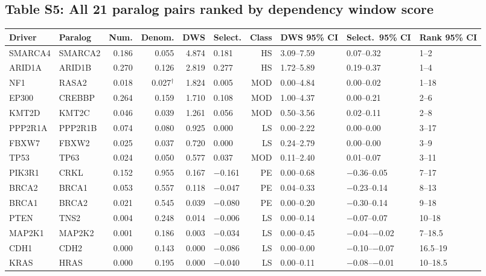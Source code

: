 \documentclass[11pt,a4paper]{article}
\begin{document}
\subsection{Table S5: All 21 paralog pairs ranked by dependency window score}
\begin{table}[H]
\centering
\scriptsize
\setlength{\tabcolsep}{3pt}
\begin{tabular}{llrrrlrlll}
\toprule
\textbf{Driver} & \textbf{Paralog} & \textbf{Num.} & \textbf{Denom.} & \textbf{DWS} & \textbf{Select.} & \textbf{Class} & \textbf{DWS 95\% CI} & \textbf{Select.\ 95\% CI} & \textbf{Rank 95\% CI} \\
\midrule
SMARCA4 & SMARCA2 & 0.186 & 0.055 & 4.874 & 0.181 & HS & 3.09--7.59 & 0.07--0.32 & 1--2 \\
ARID1A & ARID1B & 0.270 & 0.126 & 2.819 & 0.277 & HS & 1.72--5.89 & 0.19--0.37 & 1--4 \\
NF1 & RASA2 & 0.018 & 0.027$^{\dagger}$ & 1.824 & 0.005 & MOD & 0.00--4.84 & 0.00--0.02 & 1--18 \\
EP300 & CREBBP & 0.264 & 0.159 & 1.710 & 0.108 & MOD & 1.00--4.37 & 0.00--0.21 & 2--6 \\
KMT2D & KMT2C & 0.046 & 0.039 & 1.261 & 0.056 & MOD & 0.50--3.56 & 0.02--0.11 & 2--8 \\
PPP2R1A & PPP2R1B & 0.074 & 0.080 & 0.925 & 0.000 & LS & 0.00--2.22 & 0.00--0.00 & 3--17 \\
FBXW7 & FBXW2 & 0.025 & 0.037 & 0.720 & 0.000 & LS & 0.24--2.79 & 0.00--0.00 & 3--9 \\
TP53 & TP63 & 0.024 & 0.050 & 0.577 & 0.037 & MOD & 0.11--2.40 & 0.01--0.07 & 3--11 \\
PIK3R1 & CRKL & 0.152 & 0.955 & 0.167 & $-$0.161 & PE & 0.00--0.68 & $-$0.36--0.05 & 7--17 \\
BRCA2 & BRCA1 & 0.053 & 0.557 & 0.118 & $-$0.047 & PE & 0.04--0.33 & $-$0.23--0.14 & 8--13 \\
BRCA1 & BRCA2 & 0.021 & 0.545 & 0.039 & $-$0.080 & PE & 0.00--0.20 & $-$0.30--0.14 & 9--18 \\
PTEN & TNS2 & 0.004 & 0.248 & 0.014 & $-$0.006 & LS & 0.00--0.14 & $-$0.07--0.07 & 10--18 \\
MAP2K1 & MAP2K2 & 0.001 & 0.186 & 0.003 & $-$0.034 & LS & 0.00--0.45 & $-$0.04--$-$0.02 & 7--18.5 \\
CDH1 & CDH2 & 0.000 & 0.143 & 0.000 & $-$0.086 & LS & 0.00--0.00 & $-$0.10--$-$0.07 & 16.5--19 \\
KRAS & HRAS & 0.000 & 0.195 & 0.000 & $-$0.040 & LS & 0.00--0.11 & $-$0.08--$-$0.01 & 10--18.5 \\

\end{tabular}
\end{table}
\end{document}
